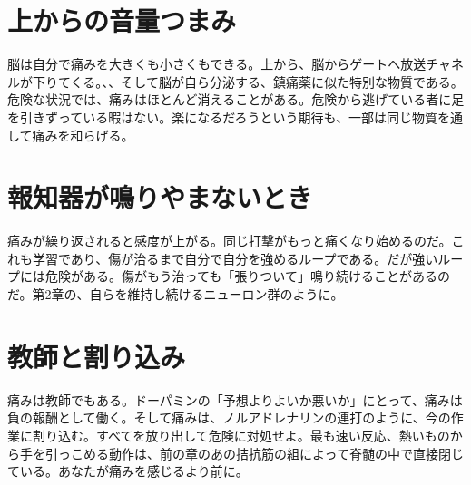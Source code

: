 \section*{上からの音量つまみ}

脳は自分で痛みを大きくも小さくもできる。上から、脳からゲートへ放送チャネルが下りてくる。、、そして脳が自ら分泌する、鎮痛薬に似た特別な物質である。危険な状況では、痛みはほとんど消えることがある。危険から逃げている者に足を引きずっている暇はない。楽になるだろうという期待も、一部は同じ物質を通して痛みを和らげる。

\section*{報知器が鳴りやまないとき}

痛みが繰り返されると感度が上がる。同じ打撃がもっと痛くなり始めるのだ。これも学習であり、傷が治るまで自分で自分を強めるループである。だが強いループには危険がある。傷がもう治っても「張りついて」鳴り続けることがあるのだ。第2章の、自らを維持し続けるニューロン群のように。

\section*{教師と割り込み}

痛みは教師でもある。ドーパミンの「予想よりよいか悪いか」にとって、痛みは負の報酬として働く。そして痛みは、ノルアドレナリンの連打のように、今の作業に割り込む。すべてを放り出して危険に対処せよ。最も速い反応、熱いものから手を引っこめる動作は、前の章のあの拮抗筋の組によって脊髄の中で直接閉じている。あなたが痛みを感じるより前に。

